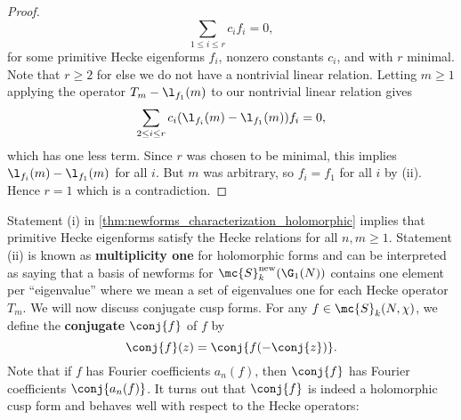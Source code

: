 \begin{proof}
      \[
        \sum_{1 \le i \le r}c_{i}f_{i} = 0,
      \]
      for some primitive Hecke eigenforms $f_{i}$, nonzero constants $c_{i}$, and with $r$ minimal. Note that $r \ge 2$ for else we do not have a nontrivial linear relation. Letting $m \ge 1$ applying the operator $T_{m}-\l_{f_{1}}(m)$ to our nontrivial linear relation gives
      \[
        \sum_{2 \le i \le r}c_{i}(\l_{f_{i}}(m)-\l_{f_{1}}(m))f_{i} = 0,
      \]
      which has one less term. Since $r$ was chosen to be minimal, this implies $\l_{f_{i}}(m)-\l_{f_{1}}(m)$ for all $i$. But $m$ was arbitrary, so $f_{i} = f_{1}$ for all $i$ by (ii). Hence $r = 1$ which is a contradiction.
    \end{proof}

    Statement (i) in \cref{thm:newforms_characterization_holomorphic} implies that primitive Hecke eigenforms satisfy the Hecke relations for all $n,m \ge 1$. Statement (ii) is known as \textbf{multiplicity one} for holomorphic forms and can be interpreted as saying that a basis of newforms for $\mc{S}_{k}^{\mathrm{new}}(\G_{1}(N))$ contains one element per ``eigenvalue'' where we mean a set of eigenvalues one for each Hecke operator $T_{m}$. We will now discuss conjugate cusp forms. For any $f \in \mc{S}_{k}(N,\chi)$, we define the \textbf{conjugate} $\conj{f}$ of $f$ by
    \[
      \conj{f}(z) = \conj{f(-\conj{z})}.
    \]
    Note that if $f$ has Fourier coefficients $a_{n}(f)$, then $\conj{f}$ has Fourier coefficients $\conj{a_{n}(f)}$. It turns out that $\conj{f}$ is indeed a holomorphic cusp form and behaves well with respect to the Hecke operators:

